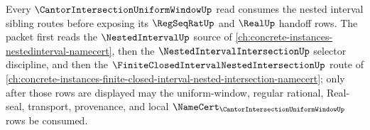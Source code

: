 Every $\CantorIntersectionUniformWindowUp$ read consumes the nested interval sibling routes before exposing its $\RegSeqRatUp$ and $\RealUp$ handoff rows. The packet first reads the $\NestedIntervalUp$ source of \autoref{ch:concrete-instances-nestedinterval-namecert}, then the $\NestedIntervalIntersectionUp$ selector discipline, and then the $\FiniteClosedIntervalNestedIntersectionUp$ route of \autoref{ch:concrete-instances-finite-closed-interval-nested-intersection-namecert}; only after those rows are displayed may the uniform-window, regular rational, Real-seal, transport, provenance, and local $\NameCert_{\CantorIntersectionUniformWindowUp}$ rows be consumed.
